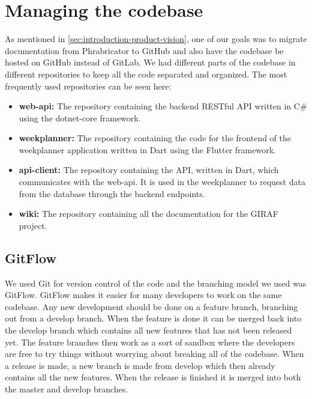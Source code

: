 \section{Managing the codebase}
As mentioned in \autoref{sec:introduction-product-vision}, one of our goals was to migrate documentation from Phrabricator to GitHub and also have the codebase be hosted on GitHub instead of GitLab. We had different parts of the codebase in different repositories to keep all the code separated and organized. The most frequently used repositories can be seen here:

\begin{itemize}
    \item \textbf{web-api:} The repository containing the backend RESTful API written in C\# using the dotnet-core framework.
    \item \textbf{weekplanner:} The repository containing the code for the frontend of the weekplanner application written in Dart using the Flutter framework. 
    \item \textbf{api-client:} The repository containing the API, written in Dart, which communicates with the web-api. It is used in the weekplanner to request data from the database through the backend endpoints.
    \item \textbf{wiki:} The repository containing all the documentation for the GIRAF project. 
\end{itemize}

\subsection{GitFlow}
We used Git for version control of the code and the branching model we used was GitFlow. 
GitFlow makes it easier for many developers to work on the same codebase. 
Any new development should be done on a feature branch, branching out from a develop branch. 
When the feature is done it can be merged back into the develop branch which contains all new features that has not been released yet. 
The feature branches then work as a sort of sandbox where the developers are free to try things without worrying about breaking all of the codebase. 
When a release is made, a new branch is made from develop which then already contains all the new features. 
When the release is finished it is merged into both the master and develop branches.